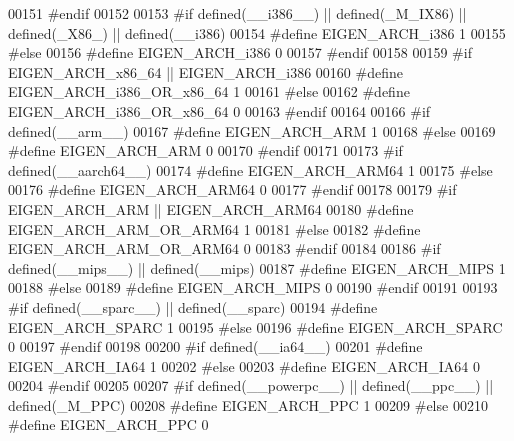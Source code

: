 \begin{DoxyCode}
00151 \textcolor{preprocessor}{#endif}
00152 
00153 \textcolor{preprocessor}{#if defined(\_\_i386\_\_) || defined(\_M\_IX86) || defined(\_X86\_) || defined(\_\_i386)}
00154 \textcolor{preprocessor}{  #define EIGEN\_ARCH\_i386 1}
00155 \textcolor{preprocessor}{#else}
00156 \textcolor{preprocessor}{  #define EIGEN\_ARCH\_i386 0}
00157 \textcolor{preprocessor}{#endif}
00158 
00159 \textcolor{preprocessor}{#if EIGEN\_ARCH\_x86\_64 || EIGEN\_ARCH\_i386}
00160 \textcolor{preprocessor}{  #define EIGEN\_ARCH\_i386\_OR\_x86\_64 1}
00161 \textcolor{preprocessor}{#else}
00162 \textcolor{preprocessor}{  #define EIGEN\_ARCH\_i386\_OR\_x86\_64 0}
00163 \textcolor{preprocessor}{#endif}
00164 
00166 \textcolor{preprocessor}{#if defined(\_\_arm\_\_)}
00167 \textcolor{preprocessor}{  #define EIGEN\_ARCH\_ARM 1}
00168 \textcolor{preprocessor}{#else}
00169 \textcolor{preprocessor}{  #define EIGEN\_ARCH\_ARM 0}
00170 \textcolor{preprocessor}{#endif}
00171 
00173 \textcolor{preprocessor}{#if defined(\_\_aarch64\_\_)}
00174 \textcolor{preprocessor}{  #define EIGEN\_ARCH\_ARM64 1}
00175 \textcolor{preprocessor}{#else}
00176 \textcolor{preprocessor}{  #define EIGEN\_ARCH\_ARM64 0}
00177 \textcolor{preprocessor}{#endif}
00178 
00179 \textcolor{preprocessor}{#if EIGEN\_ARCH\_ARM || EIGEN\_ARCH\_ARM64}
00180 \textcolor{preprocessor}{  #define EIGEN\_ARCH\_ARM\_OR\_ARM64 1}
00181 \textcolor{preprocessor}{#else}
00182 \textcolor{preprocessor}{  #define EIGEN\_ARCH\_ARM\_OR\_ARM64 0}
00183 \textcolor{preprocessor}{#endif}
00184 
00186 \textcolor{preprocessor}{#if defined(\_\_mips\_\_) || defined(\_\_mips)}
00187 \textcolor{preprocessor}{  #define EIGEN\_ARCH\_MIPS 1}
00188 \textcolor{preprocessor}{#else}
00189 \textcolor{preprocessor}{  #define EIGEN\_ARCH\_MIPS 0}
00190 \textcolor{preprocessor}{#endif}
00191 
00193 \textcolor{preprocessor}{#if defined(\_\_sparc\_\_) || defined(\_\_sparc)}
00194 \textcolor{preprocessor}{  #define EIGEN\_ARCH\_SPARC 1}
00195 \textcolor{preprocessor}{#else}
00196 \textcolor{preprocessor}{  #define EIGEN\_ARCH\_SPARC 0}
00197 \textcolor{preprocessor}{#endif}
00198 
00200 \textcolor{preprocessor}{#if defined(\_\_ia64\_\_)}
00201 \textcolor{preprocessor}{  #define EIGEN\_ARCH\_IA64 1}
00202 \textcolor{preprocessor}{#else}
00203 \textcolor{preprocessor}{  #define EIGEN\_ARCH\_IA64 0}
00204 \textcolor{preprocessor}{#endif}
00205 
00207 \textcolor{preprocessor}{#if defined(\_\_powerpc\_\_) || defined(\_\_ppc\_\_) || defined(\_M\_PPC)}
00208 \textcolor{preprocessor}{  #define EIGEN\_ARCH\_PPC 1}
00209 \textcolor{preprocessor}{#else}
00210 \textcolor{preprocessor}{  #define EIGEN\_ARCH\_PPC 0}

\end{DoxyCode}

